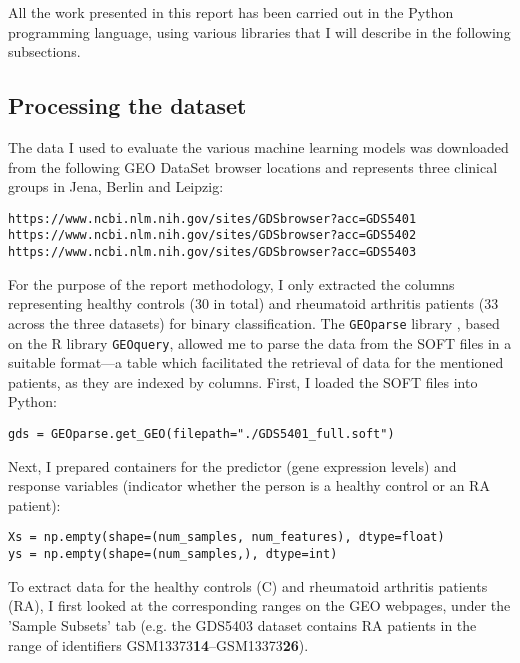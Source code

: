 \documentclass[11pt]{article}
\numberwithin{equation}{section}
\begin{document}
All the work presented in this report has been carried out in the Python programming language, using various libraries that I will describe in the following subsections.

\subsection{Processing the dataset}

The data I used to evaluate the various machine learning models was downloaded from the following GEO DataSet browser locations and represents three clinical groups in Jena, Berlin and Leipzig:

\begin{verbatim}
https://www.ncbi.nlm.nih.gov/sites/GDSbrowser?acc=GDS5401
https://www.ncbi.nlm.nih.gov/sites/GDSbrowser?acc=GDS5402
https://www.ncbi.nlm.nih.gov/sites/GDSbrowser?acc=GDS5403
\end{verbatim}

For the purpose of the report methodology, I only extracted the columns representing healthy controls (30 in total) and rheumatoid arthritis patients (33 across the three datasets) for binary classification. The \texttt{GEOparse} library \cite{geoparse}, based on the R library \texttt{GEOquery}, allowed me to parse the data from the SOFT files in a suitable format---a table which facilitated the retrieval of data for the mentioned patients, as they are indexed by columns. First, I loaded the SOFT files into Python:
\begin{verbatim}
gds = GEOparse.get_GEO(filepath="./GDS5401_full.soft")
\end{verbatim}
Next, I prepared containers for the predictor (gene expression levels) and response variables (indicator whether the person is a healthy control or an RA patient):
\begin{verbatim}
Xs = np.empty(shape=(num_samples, num_features), dtype=float)
ys = np.empty(shape=(num_samples,), dtype=int)
\end{verbatim}
To extract data for the healthy controls (C) and rheumatoid arthritis patients (RA), I first looked at the corresponding ranges on the GEO webpages,  under the 'Sample Subsets' tab (e.g. the GDS5403 dataset contains RA patients in the range of identifiers GSM13373\textbf{14}--GSM13373\textbf{26}).
\end{document}
